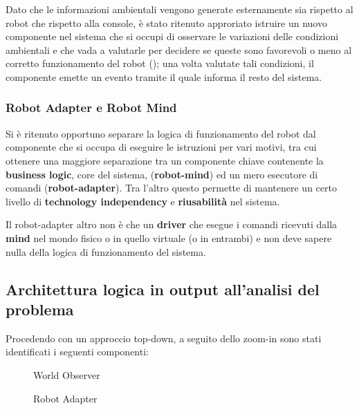Dato che le informazioni ambientali vengono generate esternamente sia rispetto al robot che rispetto alla console,
è stato ritenuto approriato istruire un nuovo componente nel sistema che si occupi di osservare le variazioni delle condizioni ambientali
e che vada a valutarle per decidere se queste sono favorevoli o meno al corretto funzionamento del robot ();
una volta valutate tali condizioni, il componente emette un evento tramite il quale informa il resto del sistema.

\subsubsection{Robot Adapter e Robot Mind}

Si è ritenuto opportuno separare la logica di funzionamento del robot dal componente che si occupa di eseguire le istruzioni per vari motivi,
tra cui ottenere una maggiore separazione tra un componente chiave contenente la \textbf{business logic}, core del sistema, (\textbf{robot-mind}) ed un mero esecutore di comandi (\textbf{robot-adapter}).
Tra l'altro questo permette di mantenere un certo livello di \textbf{technology independency} e \textbf{riusabilità} nel sistema.

Il robot-adapter altro non è che un \textbf{driver} che esegue i comandi ricevuti dalla \textbf{mind} nel mondo fisico o in quello virtuale (o in entrambi) e non deve sapere nulla della logica di funzionamento del sistema.

\subsection{Architettura logica in output all'analisi del problema}

Procedendo con un approccio top-down, a seguito dello zoom-in sono stati identificati i seguenti componenti:


\begin{figure}[H]
  \centering
  \caption{World Observer}%
  \label{fig:sp1:prob:worldobserver}
\end{figure}

\begin{figure}[H]
  \centering
  \caption{Robot Adapter}%
  \label{fig:sp1:prob:robotadapter}
\end{figure}

